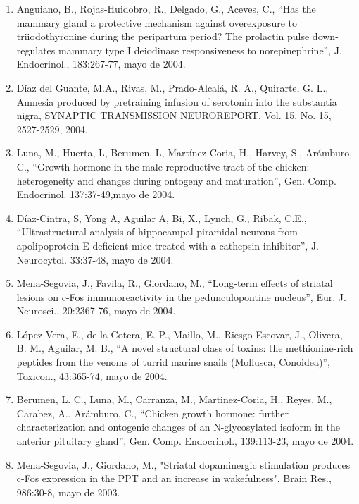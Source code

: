 \begin{enumerate}
\item Anguiano, B., Rojas-Huidobro, R., Delgado, G., Aceves, C., “Has the mammary gland a protective mechanism against 
overexposure to triiodothyronine during the peripartum period? The prolactin pulse down-regulates mammary type I deiodinase 
responsiveness to norepinephrine”, J. Endocrinol., 183:267-77, mayo de 2004.

\item Díaz del Guante, M.A., Rivas, M., Prado-Alcalá, R. A., Quirarte, G. L., Amnesia produced by pretraining infusion of 
serotonin into the substantia nigra, SYNAPTIC TRANSMISSION NEUROREPORT, Vol. 15, No. 15, 2527-2529, 2004.

\item Luna, M., Huerta, L, Berumen, L, Martínez-Coria, H., Harvey, S., Arámburo, C., “Growth hormone in the male 
reproductive 
tract of the chicken: heterogeneity and changes during ontogeny and maturation”, Gen. Comp. Endocrinol. 137:37-49,mayo de 2004.

\item Díaz-Cintra, S, Yong A, Aguilar A, Bi, X., Lynch, G., Ribak, C.E., “Ultrastructural analysis of hippocampal piramidal 
neurons from apolipoprotein E-deficient mice treated with a cathepsin inhibitor”, J. Neurocytol. 33:37-48, mayo de 2004.

\item Mena-Segovia, J., Favila, R., Giordano, M., “Long-term effects of striatal lesions on c-Fos immunoreactivity in the 
pedunculopontine nucleus”, Eur. J. Neurosci., 20:2367-76, mayo de 2004.

\item López-Vera, E., de la Cotera, E. P., Maillo, M., Riesgo-Escovar, J., Olivera, B. M., Aguilar, M. B., “A novel 
structural class of toxins: the methionine-rich peptides from the venoms of turrid marine snails (Mollusca, Conoidea)”, 
Toxicon., 43:365-74, mayo de 2004.

\item Berumen, L. C., Luna, M., Carranza, M., Martinez-Coria, H., Reyes, M., Carabez, A., Arámburo, C., “Chicken growth 
hormone: further characterization and ontogenic changes of an N-glycosylated isoform in the anterior pituitary gland”, Gen. 
Comp. Endocrinol., 139:113-23, mayo de 2004.

\item Mena-Segovia, J., Giordano, M., "Striatal dopaminergic stimulation produces c-Fos expression in the PPT and an 
increase in wakefulness", Brain Res., 986:30-8, mayo de 2003.


\end{enumerate}
